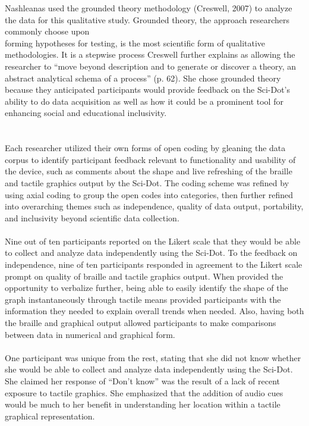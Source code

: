 \documentclass[11.5pt]{sig-alternate}
\begin{document}
\begin{large}
Nashleanas used the grounded theory methodology (Creswell, 2007) to analyze the data for this qualitative study. Grounded theory, the approach researchers commonly choose upon \\forming hypotheses for testing, is the most scientific form of qualitative methodologies. It is a stepwise process Creswell further explains as allowing the researcher to “move beyond description and to generate or discover a theory, an abstract analytical schema of a process” (p. 62). She chose grounded theory because they anticipated participants would provide feedback on the Sci-Dot’s ability to do data acquisition as well as how it could be a prominent tool for enhancing social and educational inclusivity. 
\\
\\\\Each researcher utilized their own forms of open coding by gleaning the data corpus to identify participant feedback relevant to functionality and usability of the device, such as comments about the shape and live refreshing of the braille and tactile graphics output by the Sci-Dot. The coding scheme was refined by using axial coding to group the open codes into categories, then further refined into overarching themes such as independence, quality of data output, portability, and inclusivity beyond scientific data collection. 
\\\\Nine out of ten participants reported on the Likert scale that they would be able to collect and analyze data independently using the Sci-Dot.  To the feedback on independence, nine of ten participants responded in agreement to the Likert scale prompt on quality of braille and tactile graphics output. When provided the opportunity to verbalize further, being able to easily identify the shape of the graph instantaneously through tactile means provided participants with the information they needed to explain overall trends when needed. Also, having both the braille and graphical output allowed participants to make comparisons between data in numerical and graphical form. 
\\\\One participant was unique from the rest, stating that she did not know whether she would be able to collect and analyze data independently using the Sci-Dot. She claimed her response of “Don’t know” was the result of a lack of recent exposure to tactile graphics. She emphasized that the addition of audio cues would be much to her benefit in understanding her location within a tactile graphical representation. 

\end{large}
\end{document}
